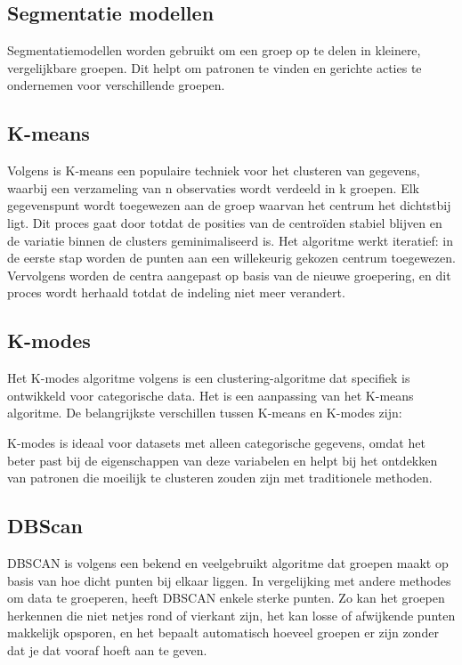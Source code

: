 \subsection{Segmentatie modellen}

Segmentatiemodellen worden gebruikt om een groep op te delen in kleinere, vergelijkbare groepen. Dit helpt om patronen te vinden en gerichte acties te ondernemen voor verschillende groepen.

\subsection*{K-means}

Volgens \textcite{Hu2023} is K-means een populaire techniek voor het clusteren van gegevens, waarbij een verzameling van n observaties wordt verdeeld in k groepen. Elk gegevenspunt wordt toegewezen aan de groep waarvan het centrum het dichtstbij ligt. Dit proces gaat door totdat de posities van de centroïden stabiel blijven en de variatie binnen de clusters geminimaliseerd is. Het algoritme werkt iteratief: in de eerste stap worden de punten aan een willekeurig gekozen centrum toegewezen. Vervolgens worden de centra aangepast op basis van de nieuwe groepering, en dit proces wordt herhaald totdat de indeling niet meer verandert.

\subsection*{K-modes}

Het K-modes algoritme volgens \textcite{Kuo2021} is een clustering-algoritme dat specifiek is ontwikkeld voor categorische data. Het is een aanpassing van het K-means algoritme. De belangrijkste verschillen tussen K-means en K-modes zijn:



K-modes is ideaal voor datasets met alleen categorische gegevens, omdat het beter past bij de eigenschappen van deze variabelen en helpt bij het ontdekken van patronen die moeilijk te clusteren zouden zijn met traditionele methoden.

\subsection*{DBScan}

DBSCAN is volgens \textcite{Hanafi2022} een bekend en veelgebruikt algoritme dat groepen maakt op basis van hoe dicht punten bij elkaar liggen. In vergelijking met andere methodes om data te groeperen, heeft DBSCAN enkele sterke punten. Zo kan het groepen herkennen die niet netjes rond of vierkant zijn, het kan losse of afwijkende punten makkelijk opsporen, en het bepaalt automatisch hoeveel groepen er zijn zonder dat je dat vooraf hoeft aan te geven.

